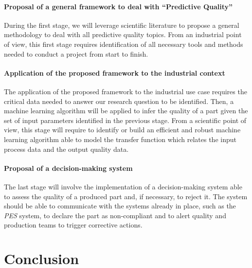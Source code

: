 \paragraph{Proposal of a general framework to deal with ``Predictive Quality''}

During the first stage, we will leverage scientific literature to propose a general methodology to deal with all predictive quality topics. From an industrial point of view, this first stage requires identification of all necessary tools and methods needed to conduct a project from start to finish. 

\paragraph{Application of the proposed framework to the industrial context}

The application of the proposed framework to the industrial use case requires the critical data needed to answer our research question to be identified. Then, a machine learning algorithm will be applied to infer the quality of a part given the set of input parameters identified in the previous stage. From a scientific point of view, this stage will require to identify or build an efficient and robust machine learning algorithm able to model the transfer function which relates the input process data and the output quality data. 

\paragraph{Proposal of a decision-making system}

The last stage will involve the implementation of a decision-making system able to assess the quality of a produced part and, if necessary, to reject it. The system should be able to communicate with the systems already in place, such as the \textit{PES} system, to declare the part as non-compliant and to alert quality and production teams to trigger corrective actions. 

\section{Conclusion}

